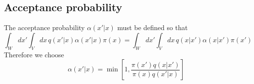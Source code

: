 \documentclass[a4paper, 11pt]{article}
\begin{document}
\subsection{Acceptance probability}

The acceptance probability $\alpha(x'|x)$ must be defined so that
\begin{equation}
  \int_Wdx'\int_Vdx\,q(x'|x)\alpha(x'|x)\pi(x)=\int_Wdx'\int_Vdx\,q(x|x')\alpha(x|x')\pi(x')
\end{equation}
Therefore we choose
\begin{equation}
  \alpha(x'|x)=\min\left[1,\frac{\pi(x')q(x|x')}{\pi(x)q(x'|x)}\right]
\end{equation}
\end{document}
